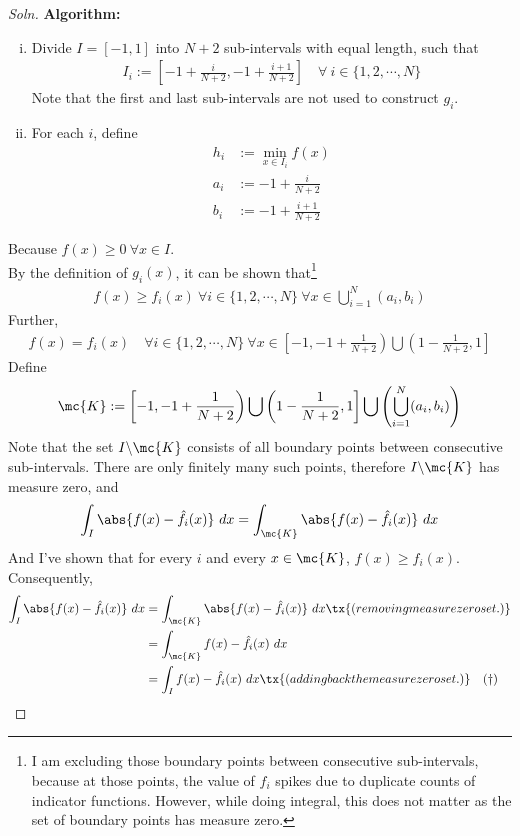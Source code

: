\documentclass{article}
\begin{document}
	\subsubsection{}
	\begin{proof}[Soln]
		\textbf{Algorithm:}
		\begin{enumerate}[(i)]
			\item Divide $I = [-1, 1]$ into $N+2$ sub-intervals with equal length, such that
			\begin{align}
				I_i := \left[
				-1 + \frac{i}{N+2},
				-1 + \frac{i+1}{N+2}
				\right]\quad \forall\ i \in \{1, 2, \cdots, N\}
			\end{align}
			Note that the first and last sub-intervals are not used to construct $g_i$.
			\item For each $i$, define
			\begin{align}
				h_i &:=\min_{x \in I_i} f(x) \\
				a_i &:= -1 + \frac{i}{N+2} \\
				b_i &:= -1 + \frac{i+1}{N+2}
			\end{align}
		\end{enumerate}
		Because $f(x) \geq 0\ \forall x \in I$.\\
		By the definition of $g_i(x)$, it can be shown that\footnote{I am excluding those boundary points between consecutive sub-intervals, because at those points, the value of $f_i$ spikes due to duplicate counts of indicator functions. However, while doing integral, this does not matter as the set of boundary points has measure zero.}
		\begin{align}
			f(x) \geq f_i(x)\ \forall i \in \{1, 2, \cdots, N\}\ \forall x \in \bigcup_{i=1}^N (a_i, b_i)
		\end{align}
		Further,
		\begin{align}
			f(x) = f_i(x)\quad \forall i \in \{1, 2, \cdots, N\}\ \forall x \in \left[-1, -1 + \frac{1}{N+2} \right) \bigcup \left (
			1 - \frac{1}{N+2}, 1 \right]
		\end{align}
		Define
		\begin{align}
			\mc{K} := \left[-1, -1 + \frac{1}{N+2} \right) \bigcup \left (
			1 - \frac{1}{N+2}, 1 \right] \bigcup \left(\bigcup_{i=1}^N (a_i, b_i) \right)
		\end{align}
		Note that the set $I \backslash \mc{K}$ consists of all boundary points between consecutive sub-intervals. There are only finitely many such points, therefore $I \backslash \mc{K}$ has measure zero, and
		\begin{align}
			\int_I \abs{f(x) - \hat{f}_i(x)}\ dx = \int_\mc{K} \abs{f(x) - \hat{f}_i(x)}\ dx
		\end{align}
		And I've shown that for every $i$ and every $x \in \mc{K}$, $f(x) \geq f_i(x)$. Consequently,
		\begin{align}
			\int_I \abs{f(x) - \hat{f}_i(x)}\ dx 
			&= \int_\mc{K} \abs{f(x) - \hat{f}_i(x)}\ dx \tx{ (removing measure zero set.)} \\
			&= \int_\mc{K} f(x) - \hat{f}_i(x)\ dx \\
			&= \int_I f(x) - \hat{f}_i(x)\ dx \tx{ (adding back the measure zero set.)}\quad (\dagger)
		\end{align}
		

\end{proof}
\end{document}
